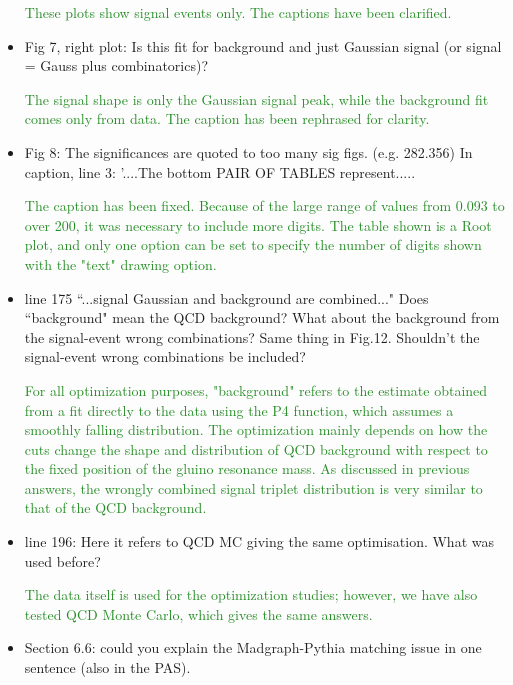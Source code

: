 \documentclass[paper=a4, fontsize=11pt]{scrartcl}
\begin{document}
\begin{itemize}
\textcolor{ForestGreen}{These plots show signal events only. The captions have been clarified.}\\

\item Fig 7, right plot: Is this fit for background and just Gaussian signal (or signal = Gauss plus combinatorics)?

\textcolor{ForestGreen}{The signal shape is only the Gaussian signal peak, while the background
fit comes only from data. The caption has been rephrased for clarity.}\\


\item Fig 8: The significances are quoted to too many sig figs. (e.g. 282.356) In caption, line 3: '....The bottom PAIR OF TABLES represent.....

\textcolor{ForestGreen}{The caption has been fixed. Because of the large range of values from 0.093 to over 200, it was necessary to include
more digits. The table shown is a Root plot, and only one option can be set to specify the number of digits shown with the "text" drawing option.}\\

\item line 175 ``...signal Gaussian and background are combined..." Does ``background" mean the QCD background? What about the background from the signal-event wrong combinations? Same thing in Fig.12. Shouldn't the signal-event wrong combinations be included?

\textcolor{ForestGreen}{For all optimization purposes, "background" refers to the estimate obtained from a fit directly to the data using the P4 function, which assumes a smoothly falling distribution. The optimization mainly depends
on how the cuts change the shape and distribution of QCD background with respect
to the fixed position of the gluino resonance mass. As discussed in previous
answers, the wrongly combined signal triplet distribution is very similar to 
that of the QCD background.}\\

\item line 196: Here it refers to QCD MC giving the same optimisation. What was used before?

\textcolor{ForestGreen}{The data itself is used for the optimization studies; however, we have also tested QCD Monte Carlo, which gives the same answers.}\\

\item Section 6.6: could you explain the Madgraph-Pythia matching issue in one sentence (also in the PAS).


\end{itemize}
\end{document}
